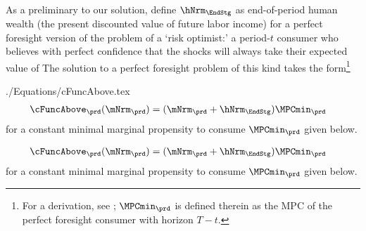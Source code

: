 \documentclass[titlepage, headings=optiontotocandhead]{econark}
\makeatletter
\newcommand{\saferlabel}[1]{%
  \ifcsname r@#1\endcsname
  \else
    \label{#1}%
  \fi
}
\makeatother
\begin{document}
  As a preliminary to our solution, define $\hNrm_{\EndStg}$ as end-of-period human wealth (the present discounted value of future labor income) for a perfect foresight version of the problem of a `risk optimist:' a period-$t$ consumer who believes with perfect confidence that the shocks will always take their expected value of   The solution to a perfect foresight problem of this kind takes the form\footnote{For a derivation, see \cite{BufferStockTheory}; $\MPCmin_{\prd}$ is defined therein as the MPC of the perfect foresight consumer with horizon $T-t$.}

\unskip
\begin{verbatimwrite}{./Equations/cFuncAbove.tex}
  \begin{equation}\begin{gathered}\begin{aligned}
        \cFuncAbove_{\prd}(\mNrm_{\prd})  & = (\mNrm_{\prd} + \hNrm_{\EndStg})\MPCmin_{\prd} \saferlabel{eq:cFuncAbove} %
      \end{aligned}\end{gathered}\end{equation}
  for a constant minimal marginal propensity to consume $\MPCmin_{\prd}$ given below.
\end{verbatimwrite}

  \begin{equation}\begin{gathered}\begin{aligned}
        \cFuncAbove_{\prd}(\mNrm_{\prd})  & = (\mNrm_{\prd} + \hNrm_{\EndStg})\MPCmin_{\prd} \saferlabel{eq:cFuncAbove} %
      \end{aligned}\end{gathered}\end{equation}
  for a constant minimal marginal propensity to consume $\MPCmin_{\prd}$ given below.

\unskip
\end{document}
